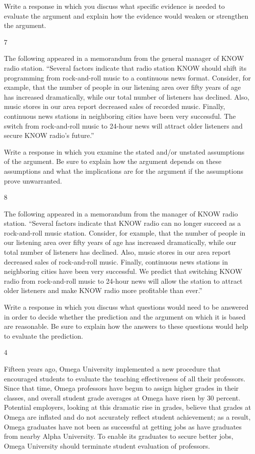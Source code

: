 \documentclass[]{article}
\begin{document}
Write a response in which you discuss what specific evidence is needed
to evaluate the argument and explain how the evidence would weaken or
strengthen the argument.

7

The following appeared in a memorandum from the general manager of KNOW
radio station. ``Several factors indicate that radio station KNOW should
shift its programming from rock-and-roll music to a continuous news
format. Consider, for example, that the number of people in our
listening area over fifty years of age has increased dramatically, while
our total number of listeners has declined. Also, music stores in our
area report decreased sales of recorded music. Finally, continuous news
stations in neighboring cities have been very successful. The switch
from rock-and-roll music to 24-hour news will attract older listeners
and secure KNOW radio's future.''

Write a response in which you examine the stated and/or unstated
assumptions of the argument. Be sure to explain how the argument depends
on these assumptions and what the implications are for the argument if
the assumptions prove unwarranted.

8

The following appeared in a memorandum from the manager of KNOW radio
station. ``Several factors indicate that KNOW radio can no longer
succeed as a rock-and-roll music station. Consider, for example, that
the number of people in our listening area over fifty years of age has
increased dramatically, while our total number of listeners has
declined. Also, music stores in our area report decreased sales of
rock-and-roll music. Finally, continuous news stations in neighboring
cities have been very successful. We predict that switching KNOW radio
from rock-and-roll music to 24-hour news will allow the station to
attract older listeners and make KNOW radio more profitable than ever.''

Write a response in which you discuss what questions would need to be
answered in order to decide whether the prediction and the argument on
which it is based are reasonable. Be sure to explain how the answers to
these questions would help to evaluate the prediction.

4

Fifteen years ago, Omega University implemented a new procedure that
encouraged students to evaluate the teaching effectiveness of all their
professors. Since that time, Omega professors have begun to assign
higher grades in their classes, and overall student grade averages at
Omega have risen by 30 percent. Potential employers, looking at this
dramatic rise in grades, believe that grades at Omega are inflated and
do not accurately reflect student achievement; as a result, Omega
graduates have not been as successful at getting jobs as have graduates
from nearby Alpha University. To enable its graduates to secure better
jobs, Omega University should terminate student evaluation of
professors.
\end{document}
